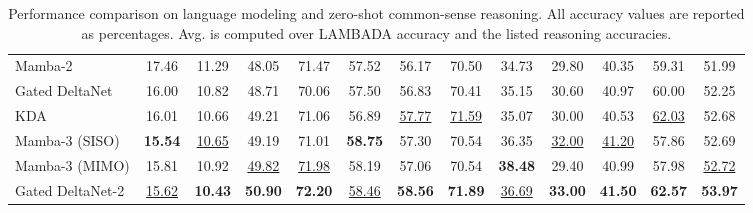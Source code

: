 \documentclass[10pt, logo, onecolumn, copyright]{nv}
\begin{document}
\begin{table}[t!]
\begin{tabular}{l|cc|cccccccccc}
\hspace{2mm} Mamba-2 & 17.46 & 11.29 & 48.05 & 71.47 & 57.52 & 56.17 & 70.50 & 34.73 & 29.80 & 40.35 & 59.31 & 51.99 \\
\hspace{2mm} Gated DeltaNet & 16.00 & 10.82 & 48.71 & 70.06 & 57.50 & 56.83 & 70.41 & 35.15 & 30.60 & 40.97 & 60.00 & 52.25 \\
\hspace{2mm} KDA & 16.01 & 10.66 & 49.21 & 71.06 & 56.89 & \underline{57.77} & \underline{71.59} & 35.07 & 30.00 & 40.53 & \underline{62.03} & 52.68 \\
\hspace{2mm} Mamba-3 (SISO) & \textbf{15.54} & \underline{10.65} & 49.19 & 71.01 & \textbf{58.75} & 57.30 & 70.54 & 36.35 & \underline{32.00} & \underline{41.20} & 57.86 & 52.69 \\
\hspace{2mm} Mamba-3 (MIMO) & 15.81 & 10.92 & \underline{49.82} & \underline{71.98} & 58.19 & 57.06 & 70.54 & \textbf{38.48} & 29.40 & 40.99 & 57.98 & \underline{52.72} \\
\hspace{2mm} Gated DeltaNet-2 & \underline{15.62} & \textbf{10.43} & \textbf{50.90} & \textbf{72.20} & \underline{58.46} & \textbf{58.56} & \textbf{71.89} & \underline{36.69} & \textbf{33.00} & \textbf{41.50} & \textbf{62.57} & \textbf{53.97} \\
\bottomrule
\end{tabular}
\addtolength{\tabcolsep}{3.2pt}
\caption{
Performance comparison on language modeling and zero-shot common-sense reasoning.
All accuracy values are reported as percentages.
Avg. is computed over LAMBADA accuracy and the listed reasoning accuracies.
}
\label{tab_commonsense_results}
\end{table}
\end{document}
